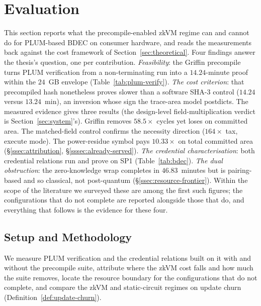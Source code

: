 \section{Evaluation}\label{sec:evaluation}
This section reports what the precompile-enabled zkVM regime can and cannot do for PLUM-based BDEC on consumer hardware, and reads the measurements back against the cost framework of Section~\ref{sec:theoretical}. Four findings answer the thesis's question, one per contribution. \emph{Feasibility}: the Griffin precompile turns PLUM verification from a non-terminating run into a $14.24$-minute proof within the $24$~GB envelope (Table~\ref{tab:plum-verify}). \emph{The cost criterion}: that precompiled hash nonetheless proves slower than a software SHA-3 control ($14.24$ versus $13.24$~min), an inversion whose sign the trace-area model postdicts. The measured evidence gives three results (the design-level field-multiplication verdict is Section~\ref{sec:system}'s). Griffin removes $58.5\times$ cycles yet loses on committed area. The matched-field control confirms the necessity direction ($164\times$ tax, execute mode). The power-residue symbol pays $10.33\times$ on total committed area (\S\ref{ssec:attribution}, \S\ref{sssec:already-served}). \emph{The credential characterisation}: both credential relations run and prove on SP1 (Table~\ref{tab:bdec}). \emph{The dual obstruction}: the zero-knowledge wrap completes in $46.83$~minutes but is pairing-based and so classical, not post-quantum (\S\ref{ssec:resource-frontier}). Within the scope of the literature we surveyed these are among the first such figures; the configurations that do not complete are reported alongside those that do, and everything that follows is the evidence for these four.

\subsection{Setup and Methodology}\label{ssec:eq}
We measure PLUM verification and the credential relations built on it with and without the precompile suite, attribute where the zkVM cost falls and how much the suite removes, locate the resource boundary for the configurations that do not complete, and compare the zkVM and static-circuit regimes on update churn (Definition~\ref{def:update-churn}).

